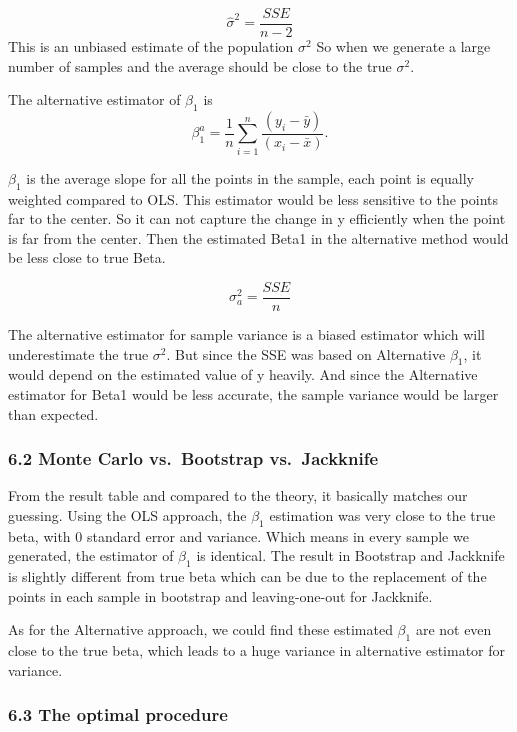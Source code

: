 \documentclass[
]{article}
\begin{document}
\[\hat\sigma^2 = \frac{SSE}{n-2}\] This is an unbiased estimate of the
population \(\sigma^2\) So when we generate a large number of samples
and the average should be close to the true \(\sigma^2.\)

The alternative estimator of \(\beta_1\) is
\[\beta_1^a = \frac{1}{n}\sum_{i=1}^{n}\frac{(y_i-\bar{y})}{(x_i-\bar{x})}.\]

\(\beta_1\) is the average slope for all the points in the sample, each
point is equally weighted compared to OLS. This estimator would be less
sensitive to the points far to the center. So it can not capture the
change in y efficiently when the point is far from the center. Then the
estimated Beta1 in the alternative method would be less close to true
Beta.

\[\sigma^2_a = \frac{SSE}{n}\]

The alternative estimator for sample variance is a biased estimator
which will underestimate the true \(\sigma^2\). But since the SSE was
based on Alternative \(\beta_1\), it would depend on the estimated value
of y heavily. And since the Alternative estimator for Beta1 would be
less accurate, the sample variance would be larger than expected.

\hypertarget{monte-carlo-vs.-bootstrap-vs.-jackknife}{%
\subsubsection{6.2 Monte Carlo vs.~Bootstrap
vs.~Jackknife}\label{monte-carlo-vs.-bootstrap-vs.-jackknife}}

From the result table and compared to the theory, it basically matches
our guessing. Using the OLS approach, the \(\beta_1\) estimation was
very close to the true beta, with 0 standard error and variance. Which
means in every sample we generated, the estimator of \(\beta_1\) is
identical. The result in Bootstrap and Jackknife is slightly different
from true beta which can be due to the replacement of the points in each
sample in bootstrap and leaving-one-out for Jackknife.

As for the Alternative approach, we could find these estimated
\(\beta_1\) are not even close to the true beta, which leads to a huge
variance in alternative estimator for variance.

\hypertarget{the-optimal-procedure}{%
\subsubsection{6.3 The optimal procedure}\label{the-optimal-procedure}}
\end{document}
